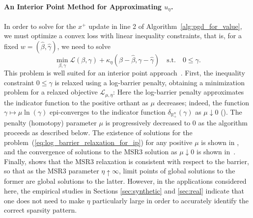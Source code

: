 
\paragraph{An Interior Point Method for Approximating $u_\eta$.}

In order to solve for the $x^+$ update in line 2 of Algorithm~\ref{alg:pgd_for_value}, we must optimize a convex loss with linear inequality constraints, that is, 
for a fixed $w = (\hat \beta, \hat \gamma)$, we need to solve 
\begin{equation}
\label{eq:ineqLoss}
\min_{\beta, \gamma} \mathcal{L}(\beta, \gamma) + \kappa_{\eta}(\beta - \hat \beta, \gamma - \hat \gamma) \quad \mbox{s.t.} \quad 0 \leq \gamma. 
\end{equation}
This problem is well suited for an interior point approach~\citep{Kojima1991,Nesterov1994,Wright1997}. 
First, the inequality constraint $0\le \gamma$ is relaxed using a log-barrier penalty, obtaining a minimization problem for a relaxed objective $\mathcal{L}_{\mu,\eta}$: 
Here the log-barrier penalty approximates the indicator function to the positive orthant as $\mu$ decreases; indeed, the function $\gamma\mapsto\mu\ln(\gamma)$ epi-converges to the indicator function $\delta_{\mathbb{R}^n_+}(\gamma)$ as $\mu \downarrow 0$ (\cite{rockafellar2009variational}). The penalty (homotopy) parameter $\mu$ is progressively decreased to $0$ as the algorithm proceeds as described below. 
The existence of solutions for the problem~(\ref{eq:log_barrier_relaxation_for_ip}) for any positive $\mu$ is shown in \cite[Theorem 5]{Theory1}, and the convergence of solutions to the MSR3 solution as $\mu\downarrow 0$ is shown in~\cite[Theorem 7]{Theory1}.  
Finally, \cite[Theorem 6]{Theory1} shows that the MSR3 relaxation is consistent with respect to the barrier, so that as the MSR3 parameter $\eta \uparrow \infty$,
 limit points of global solutions to the former are global solutions to the latter. 
 However, in the applications considered here,
 the empirical studies in Sections \ref{sec:synthetic} and \ref{sec:real}
 indicate that one does not need to make $\eta$ particularly large in order to accurately identify the correct sparsity pattern. 


